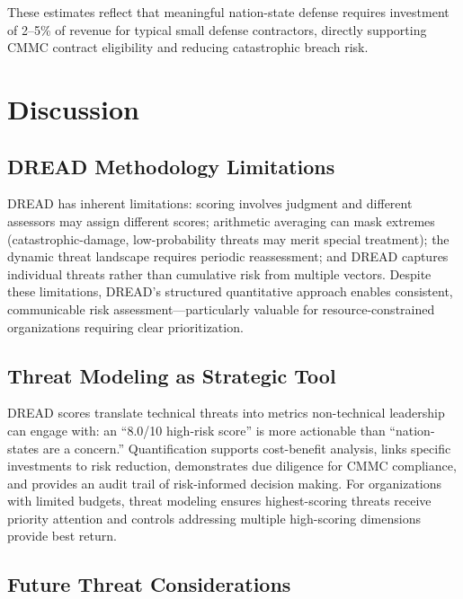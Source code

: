 \documentclass[sigconf,nonacm]{acmart}
\begin{document}
These estimates reflect that meaningful nation-state defense requires investment of
2--5\% of revenue for typical small defense contractors, directly supporting CMMC
contract eligibility and reducing catastrophic breach risk.

\section{Discussion}

\subsection{DREAD Methodology Limitations}

DREAD has inherent limitations: scoring involves judgment and different assessors may
assign different scores; arithmetic averaging can mask extremes (catastrophic-damage,
low-probability threats may merit special treatment); the dynamic threat landscape
requires periodic reassessment; and DREAD captures individual threats rather than
cumulative risk from multiple vectors. Despite these limitations, DREAD's structured
quantitative approach enables consistent, communicable risk assessment---particularly
valuable for resource-constrained organizations requiring clear prioritization.

\subsection{Threat Modeling as Strategic Tool}

DREAD scores translate technical threats into metrics non-technical leadership can engage
with: an ``8.0/10 high-risk score'' is more actionable than ``nation-states are a
concern.'' Quantification supports cost-benefit analysis, links specific investments to
risk reduction, demonstrates due diligence for CMMC compliance, and provides an audit
trail of risk-informed decision making. For organizations with limited budgets, threat
modeling ensures highest-scoring threats receive priority attention and controls
addressing multiple high-scoring dimensions provide best return.

\subsection{Future Threat Considerations}
\end{document}
